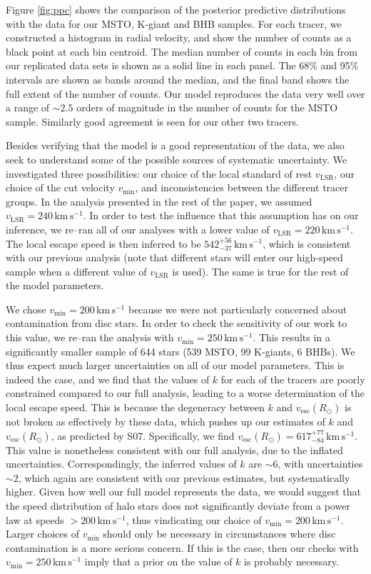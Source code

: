 \documentclass[useAMS,twocolumn,usenatbib]{mn2e}
\def\kms{{\,\mathrm{km\,s^{-1}}}}
\def\vesc{{v_\mathrm{esc}}}
\def\vmin{{v_\mathrm{min}}}
\begin{document}
Figure \ref{fig:ppc} shows the comparison of the posterior predictive distributions with the data for our MSTO, K-giant and BHB samples. 
For each tracer, we constructed a histogram in radial velocity, and show the number of counts as a black point at each bin centroid. 
The median number of counts in each bin from our replicated data sets is shown as a solid line in each panel.
The 68\% and 95\% intervals are shown as bands around the median, and the final band shows the full extent of the number of counts.  
Our model reproduces the data very well over a range of $\sim 2.5$ orders of magnitude in the number of counts for the MSTO sample. 
Similarly good agreement is seen for our other two tracers.

Besides verifying that the model is a good representation of the data, we also seek to understand some of the possible sources of systematic uncertainty.
We investigated three possibilities: our choice of the local standard of rest $v_\mathrm{LSR}$, our choice of the cut velocity $\vmin$, and inconsistencies between the different tracer groups.
In the analysis presented in the rest of the paper, we assumed $v_\mathrm{LSR} = 240\kms$. 
In order to test the influence that this assumption has on our inference, we re--ran all of our analyses with a lower value of $v_\mathrm{LSR} = 220\kms$.
The local escape speed is then inferred to be $542^{+56}_{-37}\kms$, which is consistent with our previous analysis (note that different stars will enter our high-speed sample when a different value of $v_\mathrm{LSR}$ is used). 
The same is true for the rest of the model parameters.

We chose $\vmin=200\kms$ because we were not particularly concerned about contamination from disc stars. 
In order to check the sensitivity of our work to this value, we re--ran the analysis with $\vmin = 250\kms$. 
This results in a significantly smaller sample of 644 stars (539 MSTO, 99 K-giants, 6 BHBs). 
We thus expect much larger uncertainties on all of our model parameters. 
This is indeed the case, and we find that the values of $k$ for each of the tracers are poorly constrained compared to our full analysis, leading to a worse determination of the local escape speed. 
This is because the degeneracy between $k$ and $\vesc(R_\odot)$ is not broken as effectively by these data, which pushes up our estimates of $k$ and $\vesc(R_\odot)$, as predicted by S07. 
Specifically, we find $\vesc(R_\odot) = 617^{+77}_{-84}\kms$.  
This value is nonetheless consistent with our full analysis, due to the inflated uncertainties. 
Correspondingly, the inferred values of $k$ are $\sim 6$, with uncertainties $\sim 2$, which again are consistent with our previous estimates, but systematically higher. 
Given how well our full model represents the data, we would suggest that the speed distribution of halo stars does not significantly deviate from a power law at speeds $>200\kms$, thus vindicating our choice of $\vmin = 200\kms$. 
Larger choices of $\vmin$ should only be necessary in circumstances where disc contamination is a more serious concern. 
If this is the case, then our checks with $\vmin = 250\kms$ imply that a prior on the value of $k$ is probably necessary.
\end{document}
